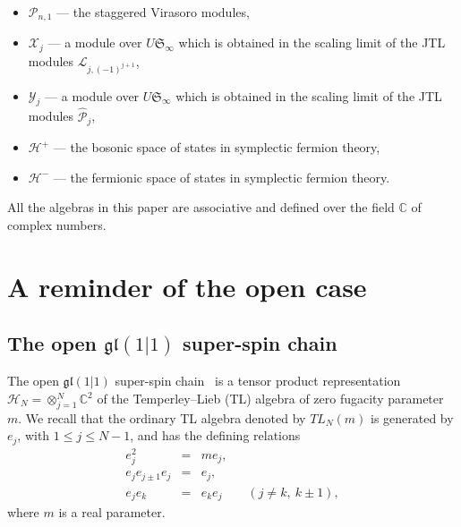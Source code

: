 \documentclass[11pt]{article}
\newcommand{\tensor}{\otimes}
\newcommand{\TL}[1]{TL_{#1}}
\newcommand{\Hilb}{\mathcal{H}}
\newcommand{\oC}{\mathbb{C}}
\newcommand{\interLie}{\mathfrak{S}}
\newcommand{\interinfin}{\interLie_{\infty}}
\newcommand{\interM}[1]{\mathscr{X}_{#1}}
\newcommand{\interP}[1]{\mathscr{Y}_{#1}}
\newcommand{\gl}{\mathfrak{gl}}
\newcommand{\chVv}{\Hilb_{N}}
\newcommand{\bimnch}{\boldsymbol{\mathcal{H}}}
\newcommand{\bimnbos}{\bimnch^{+}}
\newcommand{\bimnfer}{\bimnch^{-}}
\newcommand{\VP}{\mathcal{P}}
\newcommand{\AIrrTL}[2]{\mathscr{L}_{#1,#2}}
\newcommand{\APrTL}[1]{\widehat{\mathscr{P}}_{#1}}
\theoremstyle{definition}
\begin{document}
\begin{itemize}
\item[\mbox{}]$\VP_{n,1}$ --- the staggered Virasoro modules,

\item[\mbox{}] $\interM{j}$ --- a module over $U\interinfin$ which is obtained in the scaling limit of the JTL  modules $\AIrrTL{j}{(-1)^{j+1}}$,

\item[\mbox{}]  $\interP{j}$ --- a module over $U\interinfin$ which is obtained in the scaling limit of the JTL  modules $\APrTL{j}$,

\item[\mbox{}]$\bimnbos$ --- the bosonic  space of states in symplectic fermion theory,

\item[\mbox{}]$\bimnfer$ --- the fermionic space of states in symplectic fermion theory.

\end{itemize}

All the algebras in this paper are associative and defined over the field $\oC$ of complex numbers.

\section{A reminder of the open case}\label{sec:remind}


 \subsection{The open $\gl(1|1)$ super-spin chain}\label{sec:super-spin-ch-def}

The open  $\gl(1|1)$ super-spin chain~\cite{ReadSaleur07-1,GRS1} is a
 tensor product
 representation $\chVv=\tensor_{j=1}^{N}\oC^2$ of the Temperley--Lieb
 (TL) algebra of zero fugacity parameter $m$. We recall that the
 ordinary TL algebra denoted by $\TL{N}(m)$ is generated by $e_j$,
 with $1\leq j\leq N-1$, and has the defining relations
%
\begin{eqnarray}\label{TL-rel1}
e_j^2&=&me_j,\nonumber\\
e_je_{j\pm 1}e_j&=&e_j,\label{TL}\\
e_je_k&=&e_ke_j\qquad(j\neq k,~k\pm 1),\nonumber
\end{eqnarray}
%
where  $m$ is a real parameter.
\end{document}
